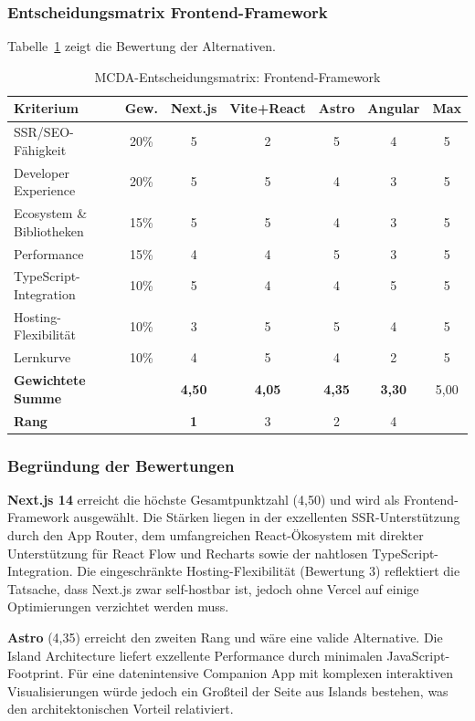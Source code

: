 \subsubsection{Entscheidungsmatrix Frontend-Framework}

Tabelle~\ref{tab:mcda-frontend} zeigt die Bewertung der Alternativen.

\begin{table}[htbp]
\centering
\caption{MCDA-Entscheidungsmatrix: Frontend-Framework}
\label{tab:mcda-frontend}
\begin{tabular}{lc|cccc|c}
\toprule
\textbf{Kriterium} & \textbf{Gew.} & \textbf{Next.js} & \textbf{Vite+React} & \textbf{Astro} & \textbf{Angular} & \textbf{Max} \\
\midrule
SSR/SEO-Fähigkeit & 20\% & 5 & 2 & 5 & 4 & 5 \\
Developer Experience & 20\% & 5 & 5 & 4 & 3 & 5 \\
Ecosystem \& Bibliotheken & 15\% & 5 & 5 & 4 & 3 & 5 \\
Performance & 15\% & 4 & 4 & 5 & 3 & 5 \\
TypeScript-Integration & 10\% & 5 & 4 & 4 & 5 & 5 \\
Hosting-Flexibilität & 10\% & 3 & 5 & 5 & 4 & 5 \\
Lernkurve & 10\% & 4 & 5 & 4 & 2 & 5 \\
\midrule
\textbf{Gewichtete Summe} & & \textbf{4,50} & \textbf{4,05} & \textbf{4,35} & \textbf{3,30} & 5,00 \\
\textbf{Rang} & & \textbf{1} & 3 & 2 & 4 & \\
\bottomrule
\end{tabular}
\end{table}

\subsubsection{Begründung der Bewertungen}

\textbf{Next.js 14} erreicht die höchste Gesamtpunktzahl (4,50) und wird als Frontend-Framework ausgewählt. Die Stärken liegen in der exzellenten SSR-Unterstützung durch den App Router, dem umfangreichen React-Ökosystem mit direkter Unterstützung für React Flow und Recharts sowie der nahtlosen TypeScript-Integration. Die eingeschränkte Hosting-Flexibilität (Bewertung 3) reflektiert die Tatsache, dass Next.js zwar self-hostbar ist, jedoch ohne Vercel auf einige Optimierungen verzichtet werden muss.

\textbf{Astro} (4,35) erreicht den zweiten Rang und wäre eine valide Alternative. Die Island Architecture liefert exzellente Performance durch minimalen JavaScript-Footprint. Für eine datenintensive Companion App mit komplexen interaktiven Visualisierungen würde jedoch ein Großteil der Seite aus \glqq Islands\grqq{} bestehen, was den architektonischen Vorteil relativiert.

